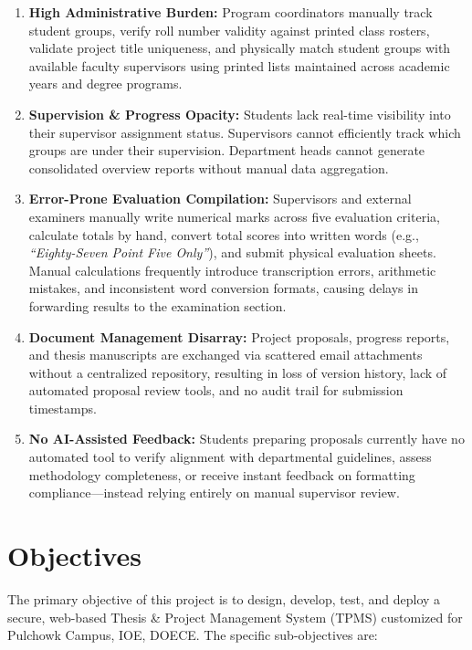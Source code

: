 \documentclass[12pt]{report}
\begin{document}
\begin{enumerate}[leftmargin=*, label=\textbf{\arabic*.}]
  \item \textbf{High Administrative Burden:} Program coordinators manually track student groups, verify roll number validity against printed class rosters, validate project title uniqueness, and physically match student groups with available faculty supervisors using printed lists maintained across academic years and degree programs.

  \item \textbf{Supervision \& Progress Opacity:} Students lack real-time visibility into their supervisor assignment status. Supervisors cannot efficiently track which groups are under their supervision. Department heads cannot generate consolidated overview reports without manual data aggregation.

  \item \textbf{Error-Prone Evaluation Compilation:} Supervisors and external examiners manually write numerical marks across five evaluation criteria, calculate totals by hand, convert total scores into written words (e.g., \textit{``Eighty-Seven Point Five Only''}), and submit physical evaluation sheets. Manual calculations frequently introduce transcription errors, arithmetic mistakes, and inconsistent word conversion formats, causing delays in forwarding results to the examination section.

  \item \textbf{Document Management Disarray:} Project proposals, progress reports, and thesis manuscripts are exchanged via scattered email attachments without a centralized repository, resulting in loss of version history, lack of automated proposal review tools, and no audit trail for submission timestamps.

  \item \textbf{No AI-Assisted Feedback:} Students preparing proposals currently have no automated tool to verify alignment with departmental guidelines, assess methodology completeness, or receive instant feedback on formatting compliance---instead relying entirely on manual supervisor review.
\end{enumerate}

\section{Objectives}

The primary objective of this project is to design, develop, test, and deploy a secure, web-based Thesis \& Project Management System (TPMS) customized for Pulchowk Campus, IOE, DOECE. The specific sub-objectives are:
\end{document}
